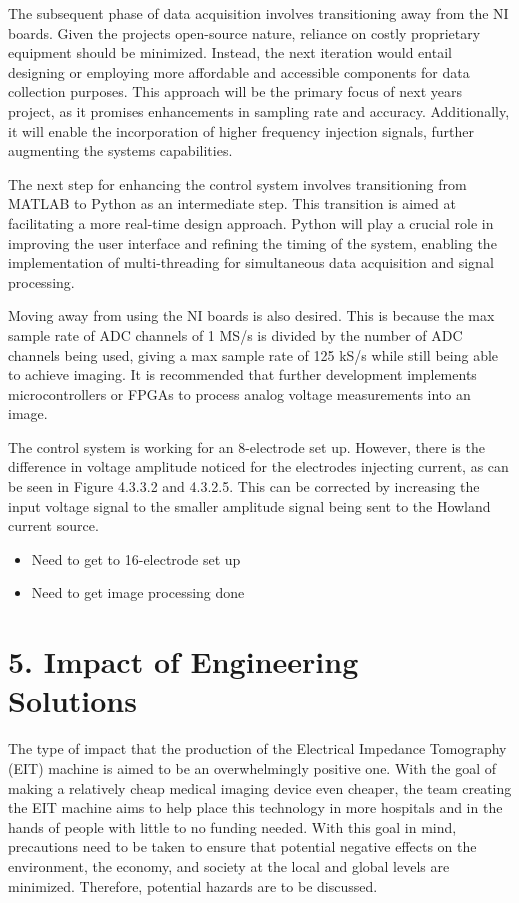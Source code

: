 The subsequent phase of data acquisition involves transitioning away
from the NI boards. Given the project\textquotesingle s open-source
nature, reliance on costly proprietary equipment should be minimized.
Instead, the next iteration would entail designing or employing more
affordable and accessible components for data collection purposes. This
approach will be the primary focus of next year\textquotesingle s
project, as it promises enhancements in sampling rate and accuracy.
Additionally, it will enable the incorporation of higher frequency
injection signals, further augmenting the system\textquotesingle s
capabilities.

The next step for enhancing the control system involves transitioning
from MATLAB to Python as an intermediate step. This transition is aimed
at facilitating a more real-time design approach. Python will play a
crucial role in improving the user interface and refining the timing of
the system, enabling the implementation of multi-threading for
simultaneous data acquisition and signal processing.

Moving away from using the NI boards is also desired. This is because
the max sample rate of ADC channels of 1 MS/s is divided by the number
of ADC channels being used, giving a max sample rate of 125 kS/s while
still being able to achieve imaging. It is recommended that further
development implements microcontrollers or FPGAs to process analog
voltage measurements into an image.

The control system is working for an 8-electrode set up. However, there
is the difference in voltage amplitude noticed for the electrodes
injecting current, as can be seen in Figure 4.3.3.2 and 4.3.2.5. This
can be corrected by increasing the input voltage signal to the smaller
amplitude signal being sent to the Howland current source.

\begin{itemize}
\item
  Need to get to 16-electrode set up
\item
  Need to get image processing done
\end{itemize}

\section*{5. Impact of Engineering
Solutions~}\label{impact-of-engineering-solutions}

The type of impact that the production of the Electrical Impedance
Tomography (EIT) machine is aimed to be an overwhelmingly positive one.
With the goal of making a relatively cheap medical imaging device even
cheaper, the team creating the EIT machine aims to help place this
technology in more hospitals and in the hands of people with little to
no funding needed. With this goal in mind, precautions need to be taken
to ensure that potential negative effects on the environment, the
economy, and society at the local and global levels are minimized.
Therefore, potential hazards are to be discussed.

